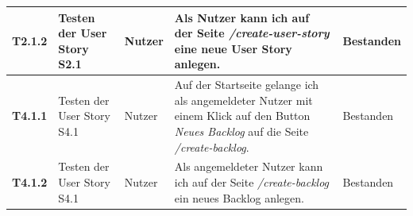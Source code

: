 \documentclass[a4paper,11pt]{article}
\begin{document}
\begin{longtable}{|p{3.3cm}|p{3.3cm}|p{3.3cm}|p{5.5cm}|p{3.3cm}|}
	\textbf{T2.1.2}                                                                                                                                                                                    &
	Testen der User Story S2.1                                                                                                                                                                         &
	Nutzer                                                                                                                                                                                             &
	Als Nutzer kann ich auf der Seite \textit{/create-user-story} eine neue User Story anlegen.                                                                                                        &
	Bestanden
	\\
	\hline

	\textbf{T4.1.1}                                                                                                                                                                                    &
	Testen der User Story S4.1                                                                                                                                                                         &
	Nutzer                                                                                                                                                                                             &
	Auf der Startseite gelange ich als angemeldeter Nutzer mit einem Klick auf den Button \textit{Neues Backlog} auf die Seite \textit{/create-backlog}.                                               &
	Bestanden
	\\
	\hline

	\textbf{T4.1.2}                                                                                                                                                                                    &
	Testen der User Story S4.1                                                                                                                                                                         &
	Nutzer                                                                                                                                                                                             &
	Als angemeldeter Nutzer kann ich auf der Seite \textit{/create-backlog} ein neues Backlog anlegen.                                                                                                 &
	Bestanden
	\\
	\hline


\end{longtable}
\end{document}
